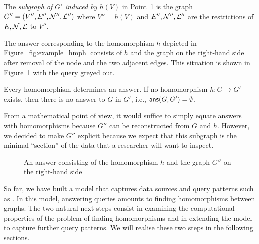 %
    The \emph{subgraph of $G'$ induced by $h(V)$} in Point~1 is the graph $G'' = (V'', E'', \mathcal{N}'', \mathcal{L}'')$
    where $V'' = h(V)$ and $E'', \mathcal{N}'', \mathcal{L}''$ are the restrictions of $E,\mathcal{N},\mathcal{L}$ to $V''$.
    
    The answer corresponding to the homomorphism $h$ depicted in Figure~\ref{fig:example_hmph}
    consists of $h$ and 
    the graph on the right-hand side after removal of the node  and the two adjacent edges.
    This situation is shown in Figure~\ref{fig:example_answer} with the query greyed out.
    
    Every homomorphism determines an answer. If no homomorphism $h : G \to G'$ exists,
    then there is no answer to $G$ in $G'$, i.e., $\textsf{ans}(G,G') =  \emptyset$.
    
    From a mathematical point of view, it would suffice to simply equate answers with homomorphisms
    because $G''$ can be reconstructed from $G$ and $h$. However, we decided to make $G''$ explicit
    because we expect that this subgraph is the minimal \enquote{section} of the data that a researcher will want to inspect.

\begin{figure}[ht]
  \centering
  \caption{An answer consisting of the homomorphism $h$ and the graph $G''$ on the right-hand side}
  \label{fig:example_answer}
\end{figure}

So far, we have built a model that captures data sources and query patterns such as .
In this model, answering queries amounts to finding homomorphisms between graphs.
The two natural next steps consist in examining the computational properties
of the problem of finding homomorphisms
and in extending the model to capture further query patterns.
We will realise these two steps in the following sections.


